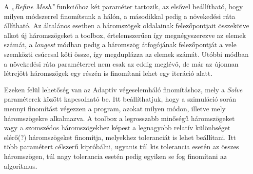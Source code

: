 A \textit{„Refine Mesh”} funkcióhoz két paraméter tartozik, az elsővel beállítható, hogy milyen módszerrel finomítsunk a hálón, a másodikkal pedig a növekedési ráta állítható. Az általános esetben a háromszögek oldalainak felezőpontjait összekötve alkot új háromszögeket a toolbox, értelemszerűen így megnégyszerezve az elemek számát, a \textit{longest} módban pedig a háromszög átfogójának felezőpontját a vele szemközti csúccsal köti össze, így megduplázza az elemek számát. Utóbbi módban a növekedési ráta paraméterrel nem csak az eddig meglévő, de már az újonnan létrejött háromszögek egy részén is finomítani lehet egy iteráció alatt.

Ezeken felül lehetőség van az Adaptív végeselemháló finomításhoz, mely a \textit{Solve} paraméterek között kapcsolható be. Itt beállíthatjuk, hogy a szimuláció során mennyi finomítást végezzen a program, azokat milyen módon, illetve mely háromszögekre alkalmazva. A toolbox a legrosszabb minőségű háromszögeket vagy a szomszédos háromszögekhez képest a legnagyobb relatív különbséget elérő(?) háromszögeket finomítja, melyekhez toleranciát is lehet beállítani. Itt több paramétert célszerű kipróbálni, ugyanis túl kis tolerancia esetén az összes háromszögen, túl nagy tolerancia esetén pedig egyiken se fog finomítani az algoritmus.


